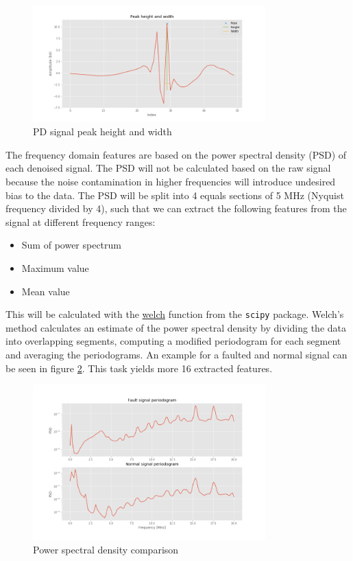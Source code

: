 \documentclass[11pt]{article}
\providecommand{\tightlist}{%
      \setlength{\itemsep}{0pt}\setlength{\parskip}{0pt}}
\begin{document}
\begin{figure}[h]
\centering
\includegraphics[width=0.8\textwidth]{signal_peak_zoom.png}
\caption{PD signal peak height and width}
\label{fig:pdsignal_peaks_width}
\end{figure}

The frequency domain features are based on the power spectral density
(PSD) of each denoised signal. The PSD will not be calculated based on
the raw signal because the noise contamination in higher frequencies
will introduce undesired bias to the data. The PSD will be split into 4
equals sections of 5 MHz (Nyquist frequency divided by 4), such that we
can extract the following features from the signal at different
frequency ranges:

\begin{itemize}
\tightlist
\item
  Sum of power spectrum
\item
  Maximum value
\item
  Mean value
\end{itemize}

This will be calculated with the
\href{https://docs.scipy.org/doc/scipy-0.14.0/reference/generated/scipy.signal.welch.html}{welch}
function from the \texttt{scipy} package. Welch's method calculates an
estimate of the power spectral density by dividing the data into
overlapping segments, computing a modified periodogram for each segment
and averaging the periodograms. An example for a faulted and normal
signal can be seen in figure \ref{fig:pdsignal_psd}. This task yields more 16
extracted features.

\begin{figure}[h]
\centering
\includegraphics[width=0.8\textwidth]{signal_fault_normal_psd_denoised.png}
\caption{Power spectral density comparison}
\label{fig:pdsignal_psd}
\end{figure}
\end{document}
